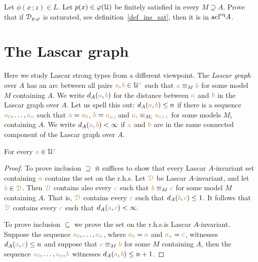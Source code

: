 \begin{exercise}
  Let $\phi(x\,;z)\in L$.
  Let $p(x)\in\varphi(\EuScript U)$ be finitely satisfied in every $M\supseteq A$.
  Prove that if $\EuScript D_{p,\varphi}$ is saturated, see definition~\ref{def_ins_sat}, then it is in $\mathop{\rm acl}^{{\rm eq}}\!A$.
\end{exercise}
\section{The Lascar graph}\label{lascar_graph}

Here we study Lascar strong types from a different viewpoint.
The \emph{Lascar graph\/} over $A$ has an arc between all pairs ${\color{brown} a},{\color{brown} b}\in \EuScript U^{\color{brown} x}$ such that  ${\color{brown} a}\equiv_M{\color{brown} b}$ for some model $M$ containing $A$.
We write \emph{$d_A({\color{brown} a},{\color{brown} b})$\/} for the distance between ${\color{brown} a}$ and ${\color{brown} b}$ in the Lascar graph over $A$.
Let us spell this out: $d_A({\color{brown} a},{\color{brown} b})\le n$ if there is a sequence ${\color{brown} a_0},\dots,{\color{brown} a_n}$ such that ${\color{brown} a}={\color{brown} a_0}$, ${\color{brown} b}={\color{brown} a_n}$, and ${\color{brown} a_i}\equiv_{M_i}{\color{brown} a_{i+1}}$ for some models $M_i$ containing $A$.
We write \emph{$d_A({\color{brown} a},{\color{brown} b})<\infty$\/} if ${\color{brown} a}$ and ${\color{brown} b}$ are in the same connected component of the Lascar graph over $A$.

\begin{proposition}\label{tipoforteLascarediametro} For every ${\color{brown} a}\in\EuScript U^{\color{brown} x}$

\end{proposition}


\begin{proof}
To prove inclusion $\supseteq$ it suffices to show that every Lascar $A$-invariant set containing ${\color{brown} a}$ contains the set on the r.h.s.
Let ${\color{brown}\EuScript D}$ be Lascar $A$-invariant, and let ${\color{brown} b}\in{\color{brown}\EuScript D}$.
Then ${\color{brown}\EuScript D}$ contains also every ${\color{brown} c}$ such that ${\color{brown} b}\equiv_M{\color{brown} c}$ for some model $M$ containing $A$.
That is, ${\color{brown}\EuScript D}$ contains every ${\color{brown} c}$ such that $d_A({\color{brown} b},{\color{brown} c})\le 1$.
It follows that ${\color{brown}\EuScript D}$ contains every ${\color{brown} c}$ such that $d_A({\color{brown} a},{\color{brown} c})<\infty$. 

To prove inclusion $\subseteq$ we prove the set on the r.h.s.\@ is Lascar $A$-invariant.
Suppose the sequence ${\color{brown} a_0},\dots,{\color{brown} a_n}$, where ${\color{brown} a_0}={\color{brown} a}$ and ${\color{brown} a_n}={\color{brown} c}$, witnesses $d_A({\color{brown} a},{\color{brown} c})\le n$ and suppose that ${\color{brown} c}\equiv_M{\color{brown} b}$ for some $M$ containing $A$, then the sequence ${\color{brown} a_0},\dots,{\color{brown} a_n},{\color{brown} b}$ witnesses $d_A({\color{brown} a},{\color{brown} b})\le n+1$.
\end{proof}

